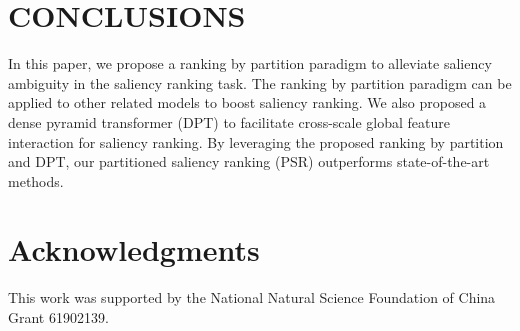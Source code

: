 \documentclass[sigconf]{acmart}
\begin{document}
\section{CONCLUSIONS}
In this paper, we propose a ranking by partition paradigm to alleviate saliency ambiguity in the saliency ranking task. The ranking by partition paradigm can be applied to other related models to boost saliency ranking. We also proposed a dense pyramid transformer (DPT) to facilitate cross-scale global feature interaction for saliency ranking. By leveraging the proposed ranking by partition and DPT, our partitioned saliency ranking (PSR) outperforms state-of-the-art methods.%

\section{Acknowledgments}
This work was supported by the National Natural Science Foundation of China Grant 61902139.

\newpage



\appendix
\end{document}

